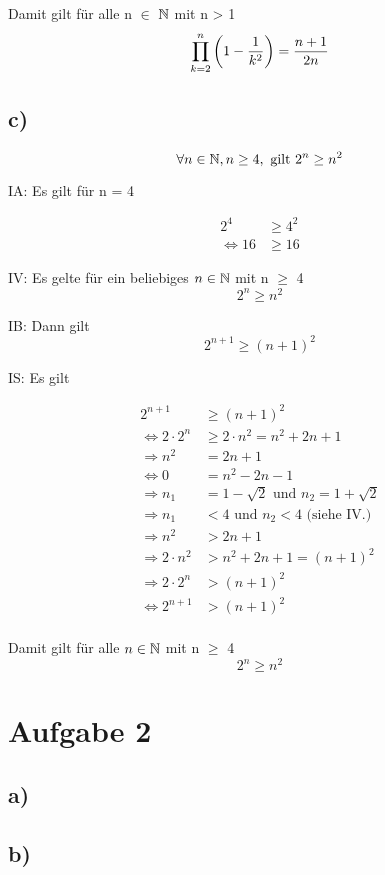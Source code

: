 \documentclass[a4paper, 11pt]{article}
\begin{document}
Damit gilt für alle n \(\in\) \(\mathbb{N}\) mit n > 1
$$ \prod_{k=2}^{n} \left(1 - \frac{1}{k^2}\right) = \frac{n + 1}{2n} $$

\subsection{c)}
\label{sec:org462334e}
$$ \forall n \in \mathbb{N}, n \geq 4, \text{ gilt } 2^n \geq n^2 $$

IA:
  Es gilt für n = 4

\begin{align*}
    2^4 &\geq 4^2 \\
    \Leftrightarrow 16 &\geq 16
\end{align*}

IV:
  Es gelte für ein beliebiges \(n \in \mathbb{N}\) mit n \(\ge\) 4
$$ 2^n \geq n^2 $$

IB:
  Dann gilt
$$ 2^{n + 1} \geq (n + 1)^2 $$

IS:
  Es gilt

\begin{align*}
    2^{n + 1} &\geq (n + 1)^2 \\
    \Leftrightarrow 2 \cdot 2^n &\geq 2 \cdot n^2 = n^2 + 2n + 1 \\
    \Rightarrow n^2 &= 2n + 1 \\
    \Leftrightarrow 0 &= n^2 - 2n - 1 \\
    \Rightarrow n_1 &= 1 - \sqrt{2} \text{ und } n_2 = 1 + \sqrt{2} \\
    \Rightarrow n_1 &< 4 \text{ und } n_2 < 4 \text{ (siehe IV.)} \\
    \Rightarrow n^2 &> 2n + 1 \\
    \Rightarrow 2 \cdot n^2 &> n^2 + 2n + 1 = (n + 1)^2 \\
    \Rightarrow 2 \cdot 2^n &> (n + 1)^2 \\
    \Leftrightarrow 2^{n + 1} &> (n + 1)^2 \\
\end{align*}


Damit gilt für alle \(n \in \mathbb{N}\) mit n \(\ge\) 4
$$ 2^n \geq n^2 $$

\section{Aufgabe 2}
\label{sec:orgf8f8866}
\subsection{a)}
\label{sec:org37ae618}
\subsection{b)}
\label{sec:orgd9eeabf}
\end{document}
